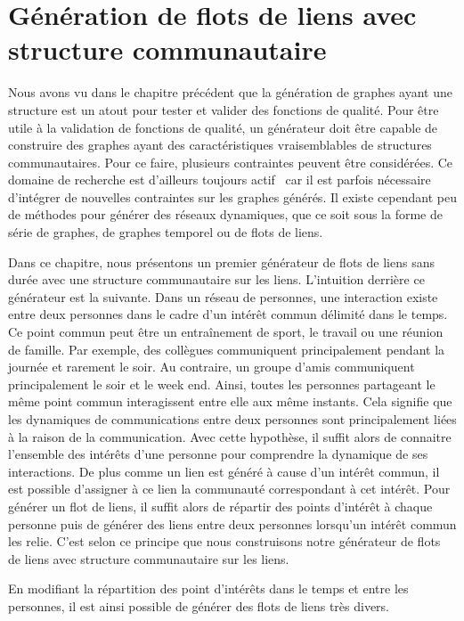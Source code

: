 \chapter{Génération de flots de liens avec structure communautaire}
\minitoc
\label{versQualite}

Nous avons vu dans le chapitre précédent que la génération de graphes ayant une structure est un atout pour tester et valider des fonctions de qualité.
Pour être utile à la validation de fonctions de qualité, un générateur doit être capable de construire des graphes ayant des caractéristiques vraisemblables de structures communautaires.
Pour ce faire, plusieurs contraintes peuvent être considérées.
Ce domaine de recherche est d'ailleurs toujours actif~\cite{Tabourier2011,Obradovic2014} car il est parfois nécessaire d'intégrer de nouvelles contraintes sur les graphes générés.
Il existe cependant peu de méthodes pour générer des réseaux dynamiques, que ce soit sous la forme de série de graphes, de graphes temporel ou de flots de liens.


Dans ce chapitre, nous présentons un premier générateur de flots de liens sans durée avec une structure communautaire sur les liens.
L'intuition derrière ce générateur est la suivante.
Dans un réseau de personnes, une interaction existe entre deux personnes dans le cadre d'un intérêt commun délimité dans le temps.
Ce point commun peut être un entraînement de sport, le travail ou une réunion de famille.
Par exemple, des collègues communiquent principalement pendant la journée et rarement le soir.
Au contraire, un groupe d'amis communiquent principalement le soir et le week end.
Ainsi, toutes les personnes partageant le même point commun interagissent entre elle aux même instants.
Cela signifie que les dynamiques de communications entre deux personnes sont principalement liées à la raison de la communication.
Avec cette hypothèse, il suffit alors de connaitre l'ensemble des intérêts d'une personne pour comprendre la dynamique de ses interactions.
De plus comme un lien est généré à cause d'un intérêt commun, il est possible d'assigner à ce lien la communauté correspondant à cet intérêt.
Pour générer un flot de liens, il suffit alors de répartir des points d'intérêt à chaque personne puis de générer des liens entre deux personnes lorsqu'un intérêt commun les relie.
C'est selon ce principe que nous construisons notre générateur de flots de liens avec structure communautaire sur les liens.

En modifiant la répartition des point d'intérêts  dans le temps et entre les personnes, il est ainsi possible de générer des flots de liens très divers.

